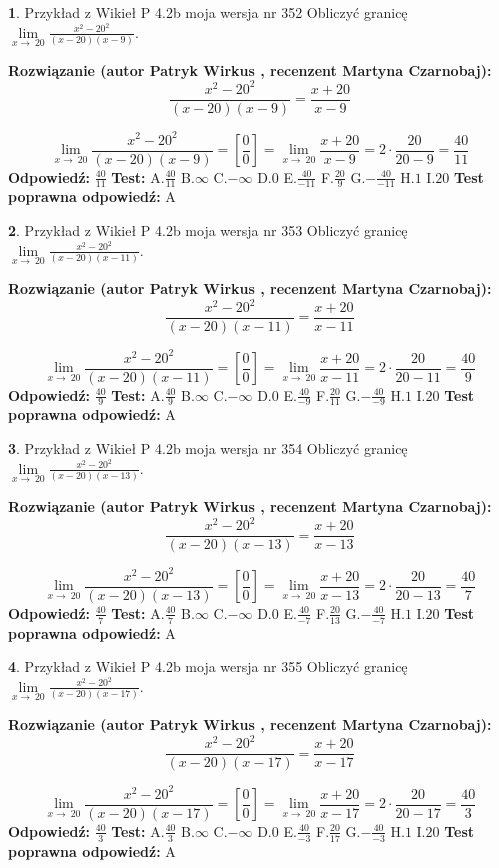 \documentclass[12pt, a4paper]{article}
\theoremstyle{definition} %
\newtheorem{zad}{}
\newcommand{\zadStart}[1]{\begin{zad}#1\newline}
\newcommand{\zadStop}{\end{zad}}
\newcommand{\rozwStart}[2]{\noindent \textbf{Rozwiązanie (autor #1 , recenzent #2): }\newline}
\newcommand{\rozwStop}{\newline}
\newcommand{\odpStart}{\noindent \textbf{Odpowiedź:}\newline}
\newcommand{\odpStop}{\newline}
\newcommand{\testStart}{\noindent \textbf{Test:}\newline}
\newcommand{\testStop}{\newline}
\newcommand{\kluczStart}{\noindent \textbf{Test poprawna odpowiedź:}\newline}
\newcommand{\kluczStop}{\newline}
\begin{document}
\zadStart{Przykład z Wikieł P 4.2b moja wersja nr 352}
Obliczyć granicę $\lim\limits_{x\to\ 20}\frac{x^{2}-20^{2}}{(x-20)(x-9)}$.
\zadStop
\rozwStart{Patryk Wirkus}{Martyna Czarnobaj}
$$\frac{x^{2}-20^{2}}{(x-20)(x-9)}=\frac{x+20}{x-9}$$

$$\lim\limits_{x\to\ 20}\frac{x^{2}-20^{2}}{(x-20)(x-9)}=[\frac{0}{0}]=\lim\limits_{x\to\ 20}\frac{x+20}{x-9}=2 \cdot \frac{20}{20-9} = \frac{40}{11}$$
\rozwStop
\odpStart
$\frac{40}{11}$
\odpStop
\testStart
A.$\frac{40}{11}$
B.$\infty$
C.$-\infty$
D.$0$
E.$\frac{40}{-11}$
F.$\frac{20}{9}$
G.$-\frac{40}{-11}$
H.$1$
I.$20$
\testStop
\kluczStart
A
\kluczStop



\zadStart{Przykład z Wikieł P 4.2b moja wersja nr 353}
Obliczyć granicę $\lim\limits_{x\to\ 20}\frac{x^{2}-20^{2}}{(x-20)(x-11)}$.
\zadStop
\rozwStart{Patryk Wirkus}{Martyna Czarnobaj}
$$\frac{x^{2}-20^{2}}{(x-20)(x-11)}=\frac{x+20}{x-11}$$

$$\lim\limits_{x\to\ 20}\frac{x^{2}-20^{2}}{(x-20)(x-11)}=[\frac{0}{0}]=\lim\limits_{x\to\ 20}\frac{x+20}{x-11}=2 \cdot \frac{20}{20-11} = \frac{40}{9}$$
\rozwStop
\odpStart
$\frac{40}{9}$
\odpStop
\testStart
A.$\frac{40}{9}$
B.$\infty$
C.$-\infty$
D.$0$
E.$\frac{40}{-9}$
F.$\frac{20}{11}$
G.$-\frac{40}{-9}$
H.$1$
I.$20$
\testStop
\kluczStart
A
\kluczStop



\zadStart{Przykład z Wikieł P 4.2b moja wersja nr 354}
Obliczyć granicę $\lim\limits_{x\to\ 20}\frac{x^{2}-20^{2}}{(x-20)(x-13)}$.
\zadStop
\rozwStart{Patryk Wirkus}{Martyna Czarnobaj}
$$\frac{x^{2}-20^{2}}{(x-20)(x-13)}=\frac{x+20}{x-13}$$

$$\lim\limits_{x\to\ 20}\frac{x^{2}-20^{2}}{(x-20)(x-13)}=[\frac{0}{0}]=\lim\limits_{x\to\ 20}\frac{x+20}{x-13}=2 \cdot \frac{20}{20-13} = \frac{40}{7}$$
\rozwStop
\odpStart
$\frac{40}{7}$
\odpStop
\testStart
A.$\frac{40}{7}$
B.$\infty$
C.$-\infty$
D.$0$
E.$\frac{40}{-7}$
F.$\frac{20}{13}$
G.$-\frac{40}{-7}$
H.$1$
I.$20$
\testStop
\kluczStart
A
\kluczStop



\zadStart{Przykład z Wikieł P 4.2b moja wersja nr 355}
Obliczyć granicę $\lim\limits_{x\to\ 20}\frac{x^{2}-20^{2}}{(x-20)(x-17)}$.
\zadStop
\rozwStart{Patryk Wirkus}{Martyna Czarnobaj}
$$\frac{x^{2}-20^{2}}{(x-20)(x-17)}=\frac{x+20}{x-17}$$

$$\lim\limits_{x\to\ 20}\frac{x^{2}-20^{2}}{(x-20)(x-17)}=[\frac{0}{0}]=\lim\limits_{x\to\ 20}\frac{x+20}{x-17}=2 \cdot \frac{20}{20-17} = \frac{40}{3}$$
\rozwStop
\odpStart
$\frac{40}{3}$
\odpStop
\testStart
A.$\frac{40}{3}$
B.$\infty$
C.$-\infty$
D.$0$
E.$\frac{40}{-3}$
F.$\frac{20}{17}$
G.$-\frac{40}{-3}$
H.$1$
I.$20$
\testStop
\kluczStart
A
\kluczStop
\end{document}

